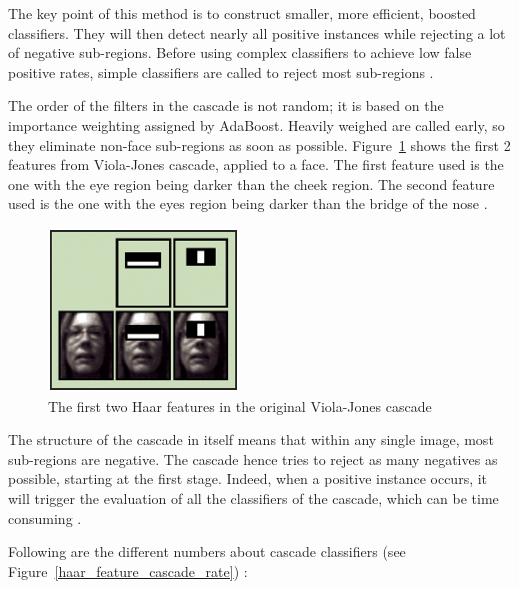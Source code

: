 \noindent The key point of this method is to construct smaller, more efficient, boosted classifiers. They will then detect nearly all positive instances while rejecting a lot of negative sub-regions. Before using complex classifiers to achieve low false positive rates, simple classifiers are called to reject most sub-regions \cite{VIO01}.
\newline

\noindent The order of the filters in the cascade is not random; it is based on the importance weighting assigned by AdaBoost. Heavily weighed are called early, so they eliminate non-face sub-regions as soon as possible. Figure~\ref{haar_feature_first_2_features} shows the first 2 features from Viola-Jones cascade, applied to a face. The first feature used is the one with the eye region being darker than the cheek region. The second feature used is the one with the eyes region being darker than the bridge of the nose \cite{HEW07}.
\newline

\begin{figure}[!h]
\begin{center}
\noindent \includegraphics[scale=1]{figures/haar_feature_first_2_features} 
\newline
\caption{The first two Haar features in the original Viola-Jones cascade}
\label{haar_feature_first_2_features}
\end{center} 
\end{figure}

\noindent The structure of the cascade in itself means that within any single image, most sub-regions are negative. The cascade hence tries to reject as many negatives as possible, starting at the first stage. Indeed, when a positive instance occurs, it will trigger the evaluation of all the classifiers of the cascade, which can be time consuming \cite{VIO01}.
\newline

\noindent Following are the different numbers about cascade classifiers (see Figure~\ref{haar_feature_cascade_rate}) \cite{UBC01}:

